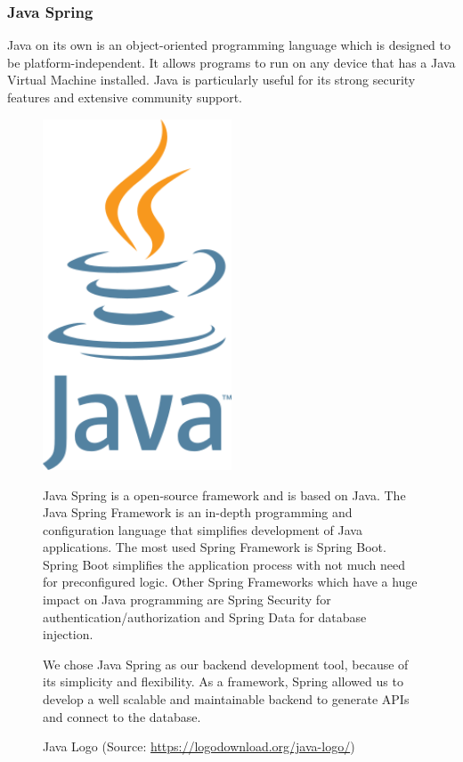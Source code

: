 \Author{\daAuthorThree}

\subsubsection{Java Spring}

Java on its own is an object-oriented programming language which is designed to be platform-independent. It allows programs to run on any device that has a Java Virtual Machine installed. Java is particularly useful for its strong security features and extensive community support.

\blankLine 

\begin{figure}[H]
    \centering
    \begin{minipage}{0.35\textwidth}
        \center
        \includegraphics [width=0.5\textwidth] {images/Technologies/javaLogo.png}
        \caption{Java Logo (Source: \url{https://logodownload.org/java-logo/})}
    \end{minipage}
    \hfill
    \begin{minipage}{0.6\textwidth}
      \setlength{\baselineskip}{1.5em}
      \vspace{-1em}
      Java Spring is a open-source framework and is based on Java. The Java Spring Framework is an in-depth programming and configuration language that simplifies development of Java applications. The most used Spring Framework is Spring Boot. Spring Boot simplifies the application process with not much need for preconfigured logic. Other Spring Frameworks which have a huge impact on Java programming are Spring Security for authentication/authorization and Spring Data for database injection. 
      
      We chose Java Spring as our backend development tool, because of its simplicity and flexibility. As a framework, Spring allowed us to develop a well scalable and maintainable backend to generate APIs and connect to the database.       
    \end{minipage}
\end{figure}
